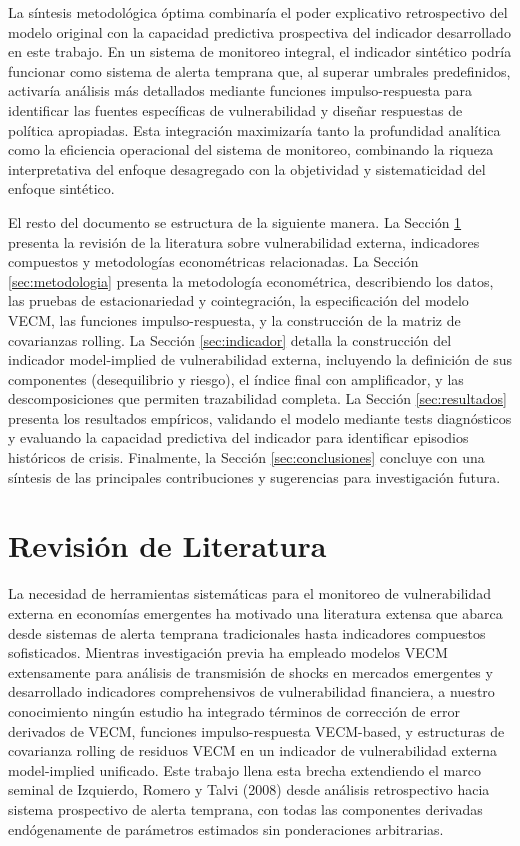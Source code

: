 \documentclass[3p,11pt,draft,natbib=false]{elsarticle}
\begin{document}
La síntesis metodológica óptima combinaría el poder explicativo retrospectivo del modelo original con la capacidad predictiva prospectiva del indicador desarrollado en este trabajo. En un sistema de monitoreo integral, el indicador sintético podría funcionar como sistema de alerta temprana que, al superar umbrales predefinidos, activaría análisis más detallados mediante funciones impulso-respuesta para identificar las fuentes específicas de vulnerabilidad y diseñar respuestas de política apropiadas. Esta integración maximizaría tanto la profundidad analítica como la eficiencia operacional del sistema de monitoreo, combinando la riqueza interpretativa del enfoque desagregado con la objetividad y sistematicidad del enfoque sintético.

El resto del documento se estructura de la siguiente manera. La Sección \ref{sec:literatura} presenta la revisión de la literatura sobre vulnerabilidad externa, indicadores compuestos y metodologías econométricas relacionadas. La Sección \ref{sec:metodologia} presenta la metodología econométrica, describiendo los datos, las pruebas de estacionariedad y cointegración, la especificación del modelo VECM, las funciones impulso-respuesta, y la construcción de la matriz de covarianzas rolling. La Sección \ref{sec:indicador} detalla la construcción del indicador model-implied de vulnerabilidad externa, incluyendo la definición de sus componentes (desequilibrio y riesgo), el índice final con amplificador, y las descomposiciones que permiten trazabilidad completa. La Sección \ref{sec:resultados} presenta los resultados empíricos, validando el modelo mediante tests diagnósticos y evaluando la capacidad predictiva del indicador para identificar episodios históricos de crisis. Finalmente, la Sección \ref{sec:conclusiones} concluye con una síntesis de las principales contribuciones y sugerencias para investigación futura.

\section{Revisión de Literatura}
\label{sec:literatura}

La necesidad de herramientas sistemáticas para el monitoreo de vulnerabilidad externa en economías emergentes ha motivado una literatura extensa que abarca desde sistemas de alerta temprana tradicionales hasta indicadores compuestos sofisticados. Mientras investigación previa ha empleado modelos VECM extensamente para análisis de transmisión de shocks en mercados emergentes y desarrollado indicadores comprehensivos de vulnerabilidad financiera, a nuestro conocimiento ningún estudio ha integrado términos de corrección de error derivados de VECM, funciones impulso-respuesta VECM-based, y estructuras de covarianza rolling de residuos VECM en un indicador de vulnerabilidad externa model-implied unificado. Este trabajo llena esta brecha extendiendo el marco seminal de Izquierdo, Romero y Talvi (2008) desde análisis retrospectivo hacia sistema prospectivo de alerta temprana, con todas las componentes derivadas endógenamente de parámetros estimados sin ponderaciones arbitrarias.
\end{document}
